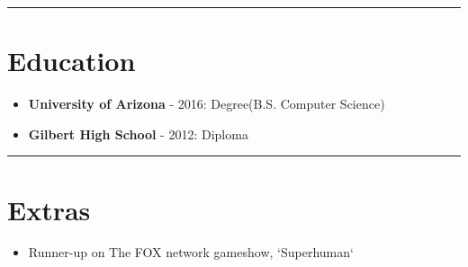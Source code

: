 \documentclass{article}
\begin{document}
\noindent\rule{\linewidth}{1pt}

\section*{Education}

\begin{itemize}\item \textbf{University of Arizona} - 2016: Degree(B.S. Computer Science)
\item \textbf{Gilbert High School} - 2012: Diploma\end{itemize}

\noindent\rule{\linewidth}{1pt}

\section*{Extras}

\begin{itemize}\item Runner-up on The FOX network gameshow, `Superhuman`\end{itemize}

\vspace*{\fill}

\end{document}

